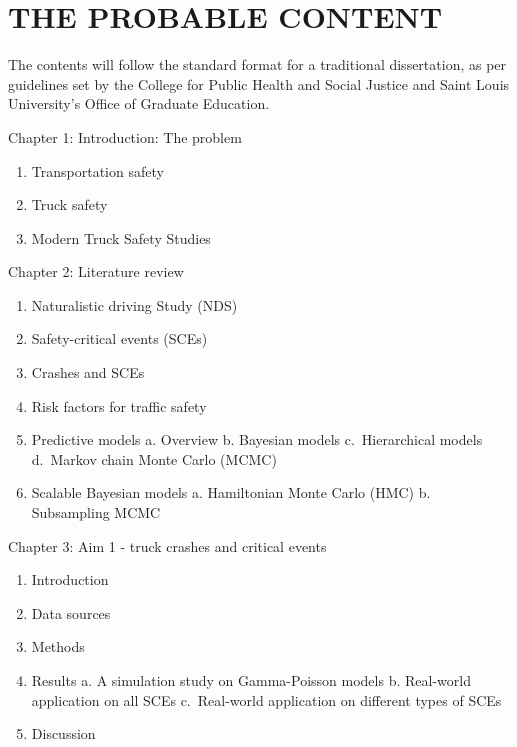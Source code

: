 \documentclass[12pt]{book}
\numberwithin{equation}{chapter}
\providecommand{\tightlist}{%
  \setlength{\itemsep}{0pt}\setlength{\parskip}{0pt}}
\begin{document}
\hypertarget{the-probable-content}{%
\chapter{THE PROBABLE CONTENT}\label{the-probable-content}}

The contents will follow the standard format for a traditional dissertation, as per guidelines set by the College for Public Health and Social Justice and Saint Louis University's Office of Graduate Education.

Chapter 1: Introduction: The problem

\begin{enumerate}
\def\labelenumi{\arabic{enumi}.}
\tightlist
\item
  Transportation safety
\item
  Truck safety
\item
  Modern Truck Safety Studies
\end{enumerate}

Chapter 2: Literature review

\begin{enumerate}
\def\labelenumi{\arabic{enumi}.}
\tightlist
\item
  Naturalistic driving Study (NDS)
\item
  Safety-critical events (SCEs)
\item
  Crashes and SCEs
\item
  Risk factors for traffic safety
\item
  Predictive models
  a. Overview
  b. Bayesian models
  c.~Hierarchical models
  d.~Markov chain Monte Carlo (MCMC)
\item
  Scalable Bayesian models
  a. Hamiltonian Monte Carlo (HMC)
  b. Subsampling MCMC
\end{enumerate}

Chapter 3: Aim 1 - truck crashes and critical events

\begin{enumerate}
\def\labelenumi{\arabic{enumi}.}
\tightlist
\item
  Introduction
\item
  Data sources
\item
  Methods
\item
  Results
  a. A simulation study on Gamma-Poisson models
  b. Real-world application on all SCEs
  c.~Real-world application on different types of SCEs
\item
  Discussion
\end{enumerate}
\end{document}
